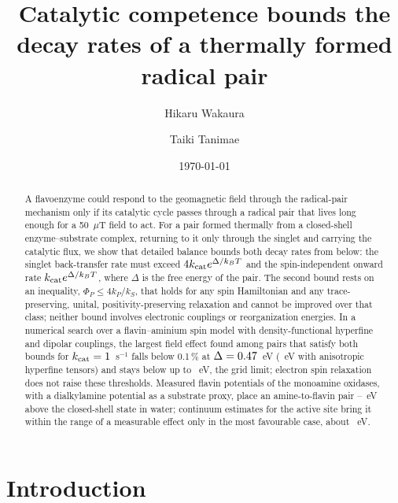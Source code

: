 \documentclass[aip,jcp,amsmath,amssymb,reprint]{revtex4-1}
\begin{document}
\title{Catalytic competence bounds the decay rates of a thermally formed
radical pair}

\author{Hikaru Wakaura}
\author{Taiki Tanimae}

\date{\today}

\begin{abstract}
A flavoenzyme could respond to the geomagnetic field through the radical-pair
mechanism only if its catalytic cycle passes through a radical
pair that lives long enough for a 50~$\mu$T field to act. For a pair formed
thermally from a closed-shell enzyme--substrate complex, returning to it only
through the singlet and carrying the catalytic flux, we show that detailed
balance bounds both decay rates from below: the singlet back-transfer rate must
exceed $4k_{\rm cat}e^{\Delta/k_BT}$ and the spin-independent onward rate
$k_{\rm cat}e^{\Delta/k_BT}$, where $\Delta$ is the free energy of the pair. The
second bound rests on an inequality, $\Phi_P\le4k_P/k_S$, that holds for any
spin Hamiltonian and any trace-preserving, unital, positivity-preserving
relaxation and cannot be improved over that class; neither bound involves
electronic couplings or reorganization energies. In a numerical search over a
flavin--aminium spin model with density-functional hyperfine and dipolar
couplings, the largest field effect found among pairs that satisfy both bounds
for $k_{\rm cat}=1$~s$^{-1}$ falls below 0.1\,\% at $\Delta=0.47$~eV
(\ThrTenthOneAniso~eV with anisotropic hyperfine tensors) and stays below up to
\GdefOneHi~eV, the grid limit; electron spin relaxation does not
raise these thresholds. Measured flavin potentials of the monoamine oxidases,
with a dialkylamine potential as a substrate proxy, place
an amine-to-flavin pair \DeltaMAOsubLo--\DeltaMAOhi~eV above the closed-shell
state in water; continuum estimates for the active site bring it within the
range of a measurable effect only in the most favourable case, about
\DeltaSiteLo~eV.
\end{abstract}

\maketitle

\section{Introduction}
\end{document}
